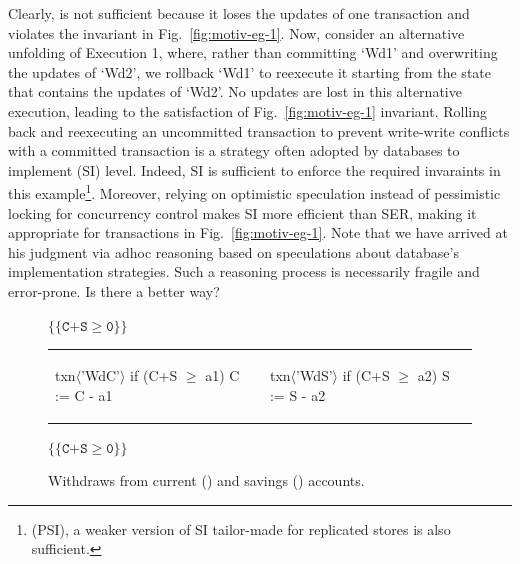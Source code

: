 Clearly,  is not sufficient because it loses the
updates of one transaction and violates the invariant in
Fig.~\ref{fig:motiv-eg-1}. Now, consider an alternative unfolding of
Execution 1, where, rather than committing `Wd1' and overwriting the
updates of `Wd2', we rollback `Wd1' to reexecute it starting from the
state that contains the updates of `Wd2'. No updates are lost in this
alternative execution, leading to the satisfaction of
Fig.~\ref{fig:motiv-eg-1} invariant. Rolling back and reexecuting an
uncommitted transaction to prevent write-write conflicts with a
committed transaction is a strategy often adopted by databases to
implement  (SI) level. Indeed, SI is
sufficient to enforce the required invaraints in this
example\footnote{ (PSI), a weaker
version of SI tailor-made for replicated stores is also sufficient.}.
Moreover, relying on optimistic speculation instead of pessimistic
locking for concurrency control makes SI more efficient than SER,
making it appropriate for transactions in Fig.~\ref{fig:motiv-eg-1}.
Note that we have arrived at his judgment via adhoc reasoning based on
speculations about database's implementation strategies. Such a
reasoning process is necessarily fragile and error-prone. Is there a
better way?

\begin{figure}
\centering
$\{\{\texttt{C+S}\ge\texttt{0}\}\}$
\begin{tabular}{l||l}
\begin{txnimpcode}
  txn$\langle$'WdC'$\rangle${
    if (C+S $\ge$ a1) {
      C := C - a1
    }
  }
\end{txnimpcode}
&
\begin{txnimpcode}
  txn$\langle$'WdS'$\rangle${
    if (C+S $\ge$ a2) {
      S := S - a2
    }
  }
\end{txnimpcode}
\\
\end{tabular}
$\{\{\texttt{C+S}\ge\texttt{0}\}\}$

\caption{Withdraws from current () and savings () accounts.}
\label{fig:motiv-eg-2}
\end{figure}

